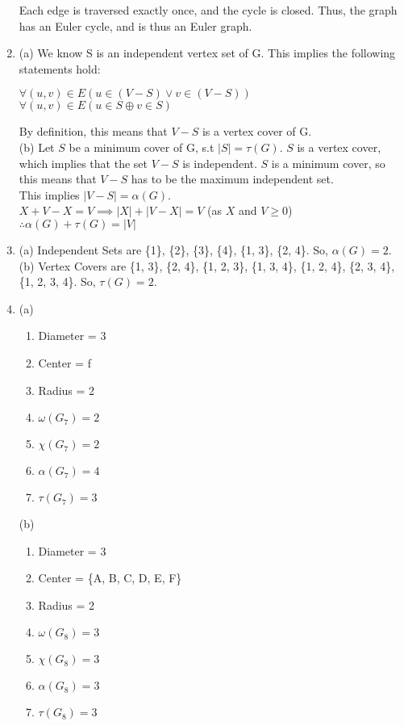 \documentclass[a4paper]{article}
\begin{document}
\begin{enumerate}
  Each edge is traversed exactly once, and the cycle is closed. Thus, the graph has an Euler cycle, and is thus an Euler graph.\\

\item (a) We know S is an independent vertex set of G. This implies the following statements hold:
\begin{center}
    $\forall (u ,v) \in E (u \in (V-S) \lor v \in (V-S))$\\
    $\forall (u ,v) \in E (u \in S \oplus v \in S)$
\end{center}

By definition, this means that $V-S$ is a vertex cover of G.\\

(b) Let $S$ be a minimum cover of G, s.t $|S| = \tau(G)$. $S$ is a vertex cover, which implies that the set $V-S$ is independent. $S$ is a minimum cover, so this means that $V-S$ has to be the maximum independent set.\\

This implies $|V-S| = \alpha(G)$.\\
$X + V - X = V \implies |X| + |V-X| = V$ (as $X$ and $V \geq 0$)\\
$\therefore \alpha(G) + \tau(G) = |V|$

\item (a) Independent Sets are \{1\}, \{2\}, \{3\}, \{4\}, \{1, 3\}, \{2, 4\}. So, $\alpha(G) = 2$.\\
(b) Vertex Covers are \{1, 3\}, \{2, 4\}, \{1, 2, 3\}, \{1, 3, 4\}, \{1, 2, 4\}, \{2, 3, 4\}, \{1, 2, 3, 4\}. So, $\tau(G) = 2$.\\

\newpage

\item (a) \begin{enumerate}[label=\roman*]
    \item Diameter = 3
    \item Center = f
    \item Radius = 2
    \item $\omega(G_7) = 2$
    \item $\chi(G_7) = 2$
    \item $\alpha(G_7) = 4$
    \item $\tau(G_7) = 3$
\end{enumerate}

(b) \begin{enumerate}[label=\roman*]
    \item Diameter = 3
    \item Center = \{A, B, C, D, E, F\}
    \item Radius = 2
    \item $\omega(G_8) = 3$
    \item $\chi(G_8) = 3$
    \item $\alpha(G_8) = 3$
    \item $\tau(G_8) = 3$
\end{enumerate}


\end{enumerate}
\end{document}
